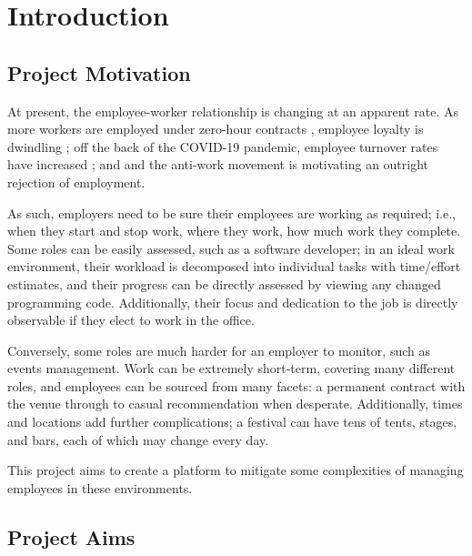 \chapter{Introduction}

\section{Project Motivation}

At present, the employee-worker relationship is changing at
an apparent rate.
As more workers are employed under zero-hour contracts
\parencite{zeroHourContractsStats}, employee loyalty is
dwindling \parencite{zeroHourContractsLoyalty}; off the
back of the COVID-19 pandemic, employee turnover rates have
increased \parencite{employeeTurnover}; and and the
anti-work movement is motivating an outright rejection of
employment\nocite{antiWorkMovement}.

As such, employers need to be sure their employees are
working as required; i.e., when they start and stop work,
where they work, how much work they complete.
Some roles can be easily assessed, such as a software
developer; in an ideal work environment, their workload is
decomposed into individual tasks with time/effort
estimates, and their progress can be directly assessed by
viewing any changed programming code.
Additionally, their focus and dedication to the job is
directly observable if they elect to work in the office.

Conversely, some roles are much harder for an employer to
monitor, such as events management.
Work can be extremely short-term, covering many different
roles, and employees can be sourced from many facets: a
permanent contract with the venue through to casual
recommendation when desperate.
Additionally, times and locations add further
complications; a festival can have tens of tents, stages,
and bars, each of which may change every day.

This project aims to create a platform to mitigate some
complexities of managing employees in these environments.

\section{Project Aims}


